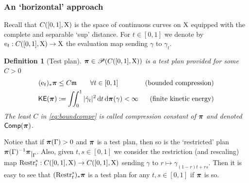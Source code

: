 \documentclass[11pt]{article}
\numberwithin{equation}{section}
\newtheorem{definition}[theorem]{Definition}
\newcommand{\ppi}{{\mbox{\boldmath$\pi$}}}
\newcommand{\restr}[1]{\lower3pt\hbox{$|_{#1}$}}
\newcommand{\pr}{\mathscr P}
\newcommand{\e}{{\rm e}}
\newcommand{\Restr}[2]{{\rm Restr}_{#1}^{#2}}
\newcommand{\X}{{\rm X}}
\newcommand{\mm}{{\mathfrak m}}
\renewcommand{\d}{{\rm d}}
\newcommand{\comp}{{\sf Comp}} %
\newcommand\KE{{\sf KE}}
\begin{document}
\subsubsection{An `horizontal' approach}\label{se:horsob}
Recall that $C([0,1],\X)$ is the space of continuous curves on $\X$ equipped with the complete and separable `sup' distance. For $t\in[0,1]$ we denote by $\e_t:C([0,1],\X)\to\X$ the evaluation map sending $\gamma$ to $\gamma_t$.
\begin{definition}[Test plan]  $\ppi\in\pr(C([0,1],\X))$ is a test plan  provided for some $C>0$ 
\begin{subequations}
\begin{align}\label{eq:boundcompr}
(\e_t)_*\ppi&\leq C\mm\qquad\forall t\in[0,1]&\text{(bounded compression)}&\\
\label{eq:finiteenergy}
\KE(\ppi)&:=\iint_0^1|\dot\gamma_t|^2\,\d t\,\d\ppi(\gamma)<\infty&\text{(finite  kinetic energy)}&
\end{align}
\end{subequations}
The least  $C$ in \eqref{eq:boundcompr} is called compression constant of $\ppi$ and denoted $\comp(\ppi)$.
\end{definition}
Notice that if $\ppi(\Gamma)>0$ and $\ppi$ is a test plan, then so is the `restricted' plan $\ppi(\Gamma)^{-1}\ppi\restr\Gamma$. Also, given $t,s\in[0,1]$ we consider the restriction (and rescaling) map $\Restr ts:C([0,1],\X)\to C([0,1],\X)$ sending $\gamma$ to $r\mapsto\gamma_{(1-r)t+rs}$. Then it is easy to see that $(\Restr ts)_*\ppi$ is a test plan for any $t,s\in[0,1]$ if $\ppi$ is so.
\end{document}
